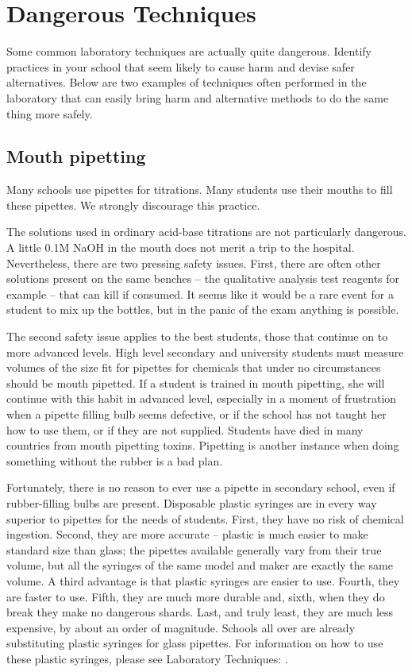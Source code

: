 \chapter{Dangerous Techniques}
\label{cha:dangertech}

Some common laboratory techniques are actually quite dangerous. 
Identify practices in your school 
that seem likely to cause harm and devise safer alternatives. 
Below are two examples of techniques often performed in the laboratory 
that can easily bring harm 
and alternative methods to do the same thing more safely.

\section{Mouth pipetting}

Many schools use pipettes for titrations. 
Many students use their mouths to fill these pipettes. 
We strongly discourage this practice.

The solutions used in ordinary acid-base titrations 
are not particularly dangerous. 
A little 0.1M NaOH in the mouth 
does not merit a trip to the hospital. 
Nevertheless, 
there are two pressing safety issues. 
First, 
there are often other solutions present on the same benches – 
the qualitative analysis test reagents for example – 
that can kill if consumed. 
It seems like it would be a rare event 
for a student to mix up the bottles, 
but in the panic of the exam anything is possible.

The second safety issue applies to the best students, 
those that continue on to more advanced levels. 
High level secondary and university students 
must measure volumes of the size fit for pipettes 
for chemicals that under no circumstances should be mouth pipetted. 
If a student is trained in mouth pipetting, 
she will continue with this habit in advanced level, 
especially in a moment of frustration 
when a pipette filling bulb seems defective, 
or if the school has not taught her how to use them, 
or if they are not supplied. 
Students have died in many countries from mouth pipetting toxins. 
Pipetting is another instance 
when doing something without the rubber is a bad plan.

Fortunately, 
there is no reason to ever use a pipette in secondary school, 
even if rubber-filling bulbs are present. 
Disposable plastic syringes are in every way superior 
to pipettes for the needs of students. 
First, 
they have no risk of chemical ingestion. 
Second, 
they are more accurate – 
plastic is much easier to make standard size than glass; 
the pipettes available generally vary from their true volume, 
but all the syringes of the same model 
and maker are exactly the same volume. 
A third advantage is that plastic syringes are easier to use. 
Fourth, 
they are faster to use. 
Fifth, 
they are much more durable and, 
sixth, 
when they do break they make no dangerous shards. 
Last, 
and truly least, 
they are much less expensive, 
by about an order of magnitude. 
Schools all over are already substituting plastic syringes for glass pipettes.
For information on how to use these plastic syringes, 
please see Laboratory Techniques: .

